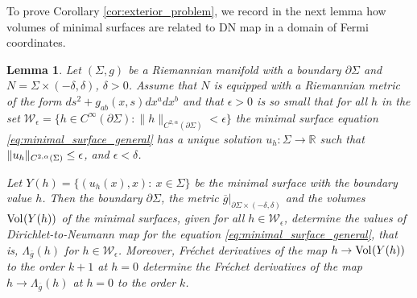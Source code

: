 \documentclass[12pt]{amsart}
\def\p{\partial}
\def\R{\mathbb R}
\DeclarePairedDelimiter\norm{\lVert}{\rVert}
\newtheorem{lemma}[theorem]{Lemma}
\theoremstyle{definition}
\theoremstyle{remark}
\newcommand{\eps}{\epsilon}
\newcommand{\s}{\hspace{0.5pt}}
\begin{document}
% 
To prove Corollary \ref{cor:exterior_problem}, we record in the next lemma how volumes of minimal surfaces are related to DN map in a domain of Fermi coordinates. 



\begin{lemma} \label{lem:minimal surfaces and the DN map}
Let $(\Sigma, g)$ be a Riemannian manifold with a boundary $\p \Sigma$ and $ N= \Sigma\times (-\delta,\delta)$, $\delta >0$.  Assume that $N$ is equipped with a Riemannian metric of the form $ds^2 +g_{ab}(x,s)dx^adx^b$ and that $\epsilon >0$ is so small that for all $h$ in the set
$\mathcal W_\epsilon=\{h\in C^\infty(\p \Sigma):\|h\|_{C^{2,\alpha}(\p  \Sigma)}<\eps\}$
the minimal surface equation \eqref{eq:minimal_surface_general} has a unique solution $u_h: \Sigma\to \R$ such that $\norm{u_h}_{C^{2,\alpha}(\Sigma)}\leq \eps$, and $\epsilon<\delta$. 

Let $Y(h)=\{(u_h(x),x):\ x\in \Sigma\}$ be the minimal surface with the boundary value $h$.
Then the boundary $\p \Sigma$, the metric
$\overline g|_{\p  \Sigma\times (-\delta,\delta)}$ and 
the volumes $ \text{Vol}\s (Y(h))$ of the minimal surfaces, given  for all
$h\in \mathcal W_\epsilon$, determine the values of Dirichlet-to-Neumann map for the equation \eqref{eq:minimal_surface_general}, that is, $\Lambda_{\overline g}(h)$
 for 
$h\in \mathcal W_\epsilon$. Moreover, Fr\'echet derivatives of the map $h\to  \text{Vol}\s (Y(h))$ 
to the order $k+1$ at $h=0$  determine the  Fr\'echet derivatives of the map $h\to \Lambda_{\overline g}(h)$
at $h=0$ to the order $k$.
% 
% 
\end{lemma}
\end{document}
